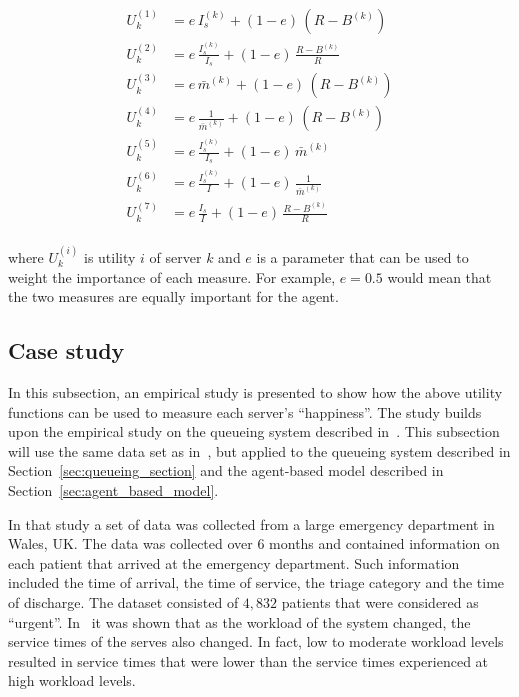 \begin{align}
    U_k^{(1)} &= e \, I_s^{(k)} + (1 - e) \, (R - B^{(k)})
    \label{eq:utility_1} \\
    U_k^{(2)} &= e \, \frac{I_s^{(k)}}{I_s} + (1 - e) \, \frac{R - B^{(k)}}{R}
    \label{eq:utility_2} \\
    U_k^{(3)} &= e \, \bar{m}^{(k)} + (1 - e) \, (R - B^{(k)})
    \label{eq:utility_3} \\
    U_k^{(4)} &= e \, \frac{1}{\bar{m}^{(k)}} + (1 - e) \, (R - B^{(k)})
    \label{eq:utility_4} \\
    U_k^{(5)} &= e \, \frac{I_s^{(k)}}{I_s} + (1 - e) \, \bar{m}^{(k)}
    \label{eq:utility_5} \\ 
    U_k^{(6)} &= e \, \frac{I_s^{(k)}}{I} + (1 - e) \, \frac{1}{\bar{m}^{(k)}}
    \label{eq:utility_6} \\
    U_k^{(7)} &= e \, \frac{I_s}{I} + (1 - e) \, \frac{R - B^{(k)}}{R}
    \label{eq:utility_7} \\
\end{align}

where \(U_k^{(i)}\) is utility \(i\) of server \(k\) and \(e\) is a parameter that
can be used to weight the importance of each measure.
For example, \(e = 0.5\) would mean that the two measures are equally important
for the agent.

\subsection{Case study}\label{sec:agent_based_case_study}

In this subsection, an empirical study is presented to show how the above
utility functions can be used to measure each server's ``happiness''.
The study builds upon the empirical study on the queueing system described
in~\cite{harper2020server}.
This subsection will use the same data set as in~\cite{harper2020server}, but
applied to the queueing system described in Section~\ref{sec:queueing_section}
and the agent-based model described in Section~\ref{sec:agent_based_model}.

In that study a set of data was collected from a large emergency department in
Wales, UK.
The data was collected over 6 months and contained information
on each patient that arrived at the emergency department.
Such information included the time of arrival, the time of service, the triage
category and the time of discharge.
The dataset consisted of \(4,832\) patients that were considered as ``urgent''.
In~\cite{harper2020server} it was shown that as the workload of the system
changed, the service times of the serves also changed.
In fact, low to moderate workload levels resulted in service times that were
lower than the service times experienced at high workload levels.

